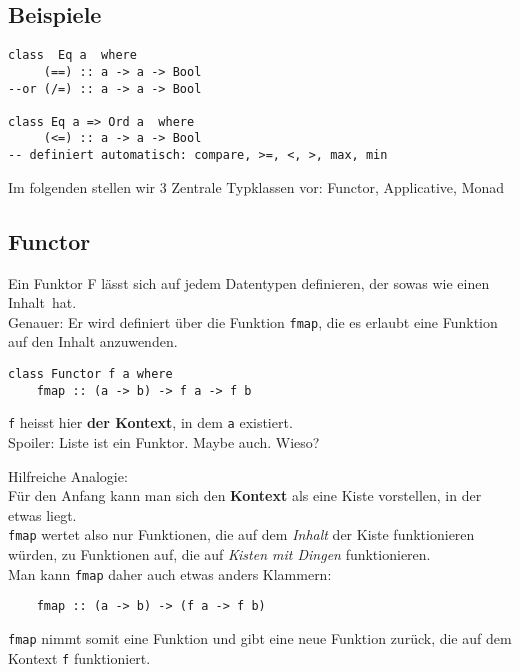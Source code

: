 \documentclass{beamer}
\begin{document}
\subsection{Beispiele}
\begin{frame}[fragile]
\begin{verbatim}
class  Eq a  where
     (==) :: a -> a -> Bool
--or (/=) :: a -> a -> Bool

class Eq a => Ord a  where
     (<=) :: a -> a -> Bool
-- definiert automatisch: compare, >=, <, >, max, min
\end{verbatim}
\pause
Im folgenden stellen wir 3 Zentrale Typklassen vor: Functor, Applicative, Monad
\end{frame}


\subsection{Functor}
\begin{frame}[fragile]
 Ein Funktor F lässt sich auf jedem Datentypen definieren, der sowas wie einen \glqq Inhalt\grqq \ hat.\\
 \pause
 Genauer: Er wird definiert über die Funktion \texttt{fmap}, die es erlaubt eine Funktion auf den Inhalt anzuwenden.
 \begin{verbatim}
class Functor f a where
    fmap :: (a -> b) -> f a -> f b
 \end{verbatim}
 \texttt{f} heisst hier \textbf{der Kontext}, in dem \texttt{a} existiert.\\
\pause
\bigskip
Spoiler: Liste ist ein Funktor. Maybe auch. Wieso?
\end{frame}

\begin{frame}[fragile]
Hilfreiche Analogie:\\
Für den Anfang kann man sich den \textbf{Kontext} als eine Kiste vorstellen, in der etwas liegt.\\
\bigskip
\pause
\texttt{fmap} wertet also nur Funktionen, die auf dem \emph{Inhalt} der Kiste funktionieren würden, zu Funktionen auf, die auf \emph{Kisten mit Dingen} funktionieren.\\\bigskip
\pause
Man kann \texttt{fmap} daher auch etwas anders Klammern:
\begin{verbatim}
    fmap :: (a -> b) -> (f a -> f b)
\end{verbatim}
\texttt{fmap} nimmt somit eine Funktion und gibt eine neue Funktion zurück, die auf dem Kontext \texttt{f} funktioniert.
\end{frame}
\end{document}
